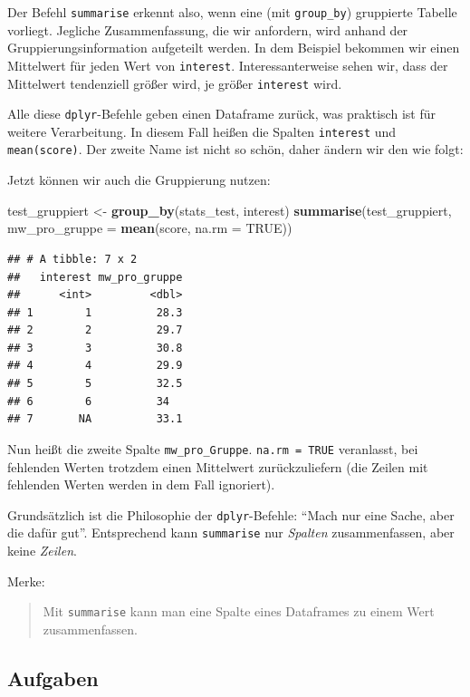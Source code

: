 \documentclass[12pt,ngerman,paper=a4,pagesize,DIV=13]{scrreprt}
\newenvironment{Shaded}{\begin{snugshade}}{\end{snugshade}}
\newcommand{\DataTypeTok}[1]{\textcolor[rgb]{0.13,0.29,0.53}{#1}}
\newcommand{\KeywordTok}[1]{\textcolor[rgb]{0.13,0.29,0.53}{\textbf{#1}}}
\newcommand{\NormalTok}[1]{#1}
\newcommand{\OtherTok}[1]{\textcolor[rgb]{0.56,0.35,0.01}{#1}}
\newcommand{\StringTok}[1]{\textcolor[rgb]{0.31,0.60,0.02}{#1}}
\begin{document}
Der Befehl \texttt{summarise} erkennt also, wenn eine (mit
\texttt{group\_by}) gruppierte Tabelle vorliegt. Jegliche
Zusammenfassung, die wir anfordern, wird anhand der
Gruppierungsinformation aufgeteilt werden. In dem Beispiel bekommen wir
einen Mittelwert für jeden Wert von \texttt{interest}.
Interessanterweise sehen wir, dass der Mittelwert tendenziell größer
wird, je größer \texttt{interest} wird.

Alle diese \texttt{dplyr}-Befehle geben einen Dataframe zurück, was
praktisch ist für weitere Verarbeitung. In diesem Fall heißen die
Spalten \texttt{interest} und \texttt{mean(score)}. Der zweite Name ist
nicht so schön, daher ändern wir den wie folgt:

Jetzt können wir auch die Gruppierung nutzen:

\begin{Shaded}
\begin{Highlighting}[]
\NormalTok{test_gruppiert <-}\StringTok{ }\KeywordTok{group_by}\NormalTok{(stats_test, interest)}
\KeywordTok{summarise}\NormalTok{(test_gruppiert, }\DataTypeTok{mw_pro_gruppe =} \KeywordTok{mean}\NormalTok{(score, }\DataTypeTok{na.rm =} \OtherTok{TRUE}\NormalTok{))}
\end{Highlighting}
\end{Shaded}

\begin{verbatim}
## # A tibble: 7 x 2
##   interest mw_pro_gruppe
##      <int>         <dbl>
## 1        1          28.3
## 2        2          29.7
## 3        3          30.8
## 4        4          29.9
## 5        5          32.5
## 6        6          34  
## 7       NA          33.1
\end{verbatim}

Nun heißt die zweite Spalte \texttt{mw\_pro\_Gruppe}.
\texttt{na.rm\ =\ TRUE} veranlasst, bei fehlenden Werten trotzdem einen
Mittelwert zurückzuliefern (die Zeilen mit fehlenden Werten werden in
dem Fall ignoriert).

Grundsätzlich ist die Philosophie der \texttt{dplyr}-Befehle:
\enquote{Mach nur eine Sache, aber die dafür gut}. Entsprechend kann
\texttt{summarise} nur \emph{Spalten} zusammenfassen, aber keine
\emph{Zeilen}.

Merke:

\begin{quote}
Mit \texttt{summarise} kann man eine Spalte eines Dataframes zu einem
Wert zusammenfassen.
\end{quote}

\hypertarget{aufgaben-4}{%
\subsection{Aufgaben}\label{aufgaben-4}}
\end{document}
